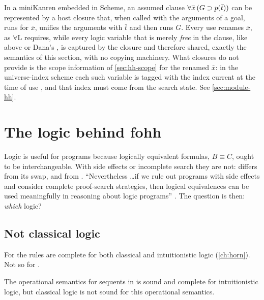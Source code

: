 {{\begin{kanren}
In a miniKanren embedded in Scheme, an assumed clause $\forall\bar x\,(G\supset p(\bar t))$ can be represented
by a host closure that, when called with the arguments of a goal, runs  for $\bar x$, unifies
the arguments with $\bar t$ and then runs $G$. Every use renames $\bar x$, as $\forall$L requires, while
every logic variable that is merely \emph{free} in the clause, like  above or Dana's , is
captured by the closure and therefore shared, exactly the semantics of this section, with no copying
machinery. What closures do not provide is the scope information of \cref{sec:hh-scope} for the renamed
$\bar x$: in the universe-index scheme each such variable is tagged with the index current at the time of use
\cite{NadathurJayaramanKwon1995}, and that index must come from the search state. See \cref{sec:module-hh}.
\end{kanren}

\section{The logic behind fohh}\label{sec:hh-logic}

Logic is useful for programs because logically equivalent formulas, $B\equiv C$, ought to be
interchangeable. With side effects or incomplete search they are not: 
differs from its swap, and  from . ``Nevertheless \dots if we rule out
programs with side effects and consider complete proof-search strategies, then logical equivalences can be
used meaningfully in reasoning about logic programs'' . The question is then: \emph{which} logic?

\subsection{Not classical logic}

For \fohc{} the rules are complete for both classical and intuitionistic logic (\cref{ch:horn}). Not so
for \fohh.

\begin{theorem}[\book{89}]\label{thm:hh-intuitionistic}
The operational semantics for sequents in \fohh{} is sound and complete for intuitionistic logic, but
classical logic is not sound for this operational semantics.
\end{theorem}

}}
